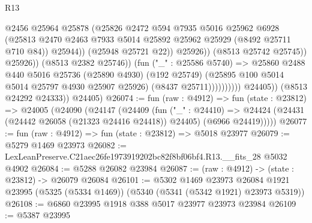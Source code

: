 \begin{lexlean}{R13}
\begin{coremodule}
                                            @2456
                                            @25964
                                            @25878
                                            (@25826
                                              @2472
                                              @594
                                              @7935
                                              @5016
                                              @25962
                                              @6928
                                              (@25813
                                                @2470
                                                @2463
                                                @7933
                                                @5014
                                                @25892
                                                @25962
                                                @25929
                                                (@8492 @25711 @710 @84))
                                              @25944))
                                          (@25948 @25721 @22))
                                        @25926))
                                    (@8513 @25742 @25745))
                                  @25926))
                              (@8513 @2382 @25746))
                            (fun ("_" : @25586 @5740) =>
                            @25860
                              @2488
                              @440
                              @5016
                              @25736
                              (@25890 @4930)
                              (@192 @25749)
                              (@25895 @100 @5014 @5014 @25797 @4930 @25907 @25926)
                              (@8437 @25711))))))))))
            @24405))
        (@8513 @24292 @24333))
      @24405)
@26074 := fun (raw : @4912) =>
  fun (state : @23812) =>
  @24005
    (@24090
      (@24147
        (@24409
          (fun ("_" : @24410) =>
          @24424 (@24431 (@24442 @26058 (@21323 @24416 @24418)) @24405) (@6966 @24419)))))
@26077 := fun (raw : @4912) => fun (state : @23812) => @5018 @23977
@26079 := @5279 @1469 @23973
@26082 := LexLeanPreserve.C21aec26fe1973919202bc82f8bf06bf4.R13.__fits_28 @5032 @4902
@26084 := @5288 @26082 @23984
@26087 := (raw : @4912) -> (state : @23812) -> @26079 @26084
@26101 := @5302
    @1469
    @23973
    @26084
    @1921
    @23995
    (@5325 (@5334 @1469))
    (@5340 (@5341 (@5342 @1921) @23973 @5319))
@26108 := @6860 @23995 @1918 @388 @5017 @23977 @23973 @23984
@26109 := @5387 @23995

\end{coremodule}
\end{lexlean}
